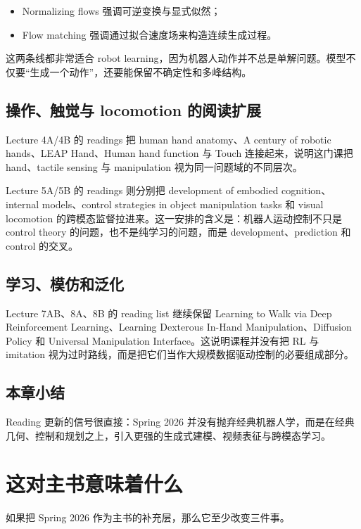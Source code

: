 \documentclass[a4paper]{article}
\begin{document}
\begin{itemize}
  \item Normalizing flows 强调可逆变换与显式似然；
  \item Flow matching 强调通过拟合速度场来构造连续生成过程。
\end{itemize}

这两条线都非常适合 robot learning，因为机器人动作并不总是单解问题。模型不仅要“生成一个动作”，还要能保留不确定性和多峰结构。

\subsection{操作、触觉与 locomotion 的阅读扩展}

Lecture 4A/4B 的 readings 把 human hand anatomy、A century of robotic hands、LEAP Hand、Human hand function 与 Touch 连接起来，说明这门课把 hand、tactile sensing 与 manipulation 视为同一问题域的不同层次。

Lecture 5A/5B 的 readings 则分别把 development of embodied cognition、internal models、control strategies in object manipulation tasks 和 visual locomotion 的跨模态监督拉进来。这一安排的含义是：机器人运动控制不只是 control theory 的问题，也不是纯学习的问题，而是 development、prediction 和 control 的交叉。

\subsection{学习、模仿和泛化}

Lecture 7AB、8A、8B 的 reading list 继续保留 Learning to Walk via Deep Reinforcement Learning、Learning Dexterous In-Hand Manipulation、Diffusion Policy 和 Universal Manipulation Interface。这说明课程并没有把 RL 与 imitation 视为过时路线，而是把它们当作大规模数据驱动控制的必要组成部分。

\subsection{本章小结}

Reading 更新的信号很直接：Spring 2026 并没有抛弃经典机器人学，而是在经典几何、控制和规划之上，引入更强的生成式建模、视频表征与跨模态学习。

\section{这对主书意味着什么}

如果把 Spring 2026 作为主书的补充层，那么它至少改变三件事。
\end{document}
